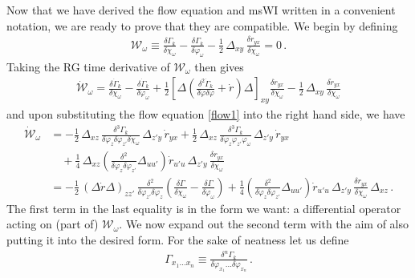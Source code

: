 \documentclass[11pt,draft]{book} %
\begin{document}
Now that we have derived the flow equation and msWI written in a convenient notation,
we are ready to prove that they are compatible. We begin by defining
\begin{align}
	\mathcal{W}_\omega\equiv\frac{\delta \Gamma_k}{\delta\chi_\omega}-\frac{\delta \Gamma_k}{\delta\varphi_\omega}
	- \frac{1}{2} \, \Delta_{xy} \, \frac{\delta r_{yx}}{\delta\chi_\omega} =0 \,.
\label{cal-W}
\end{align}
Taking the RG time derivative of $\mathcal{W_\omega}$ then gives
\begin{align}
	\mathcal{\dot W}_\omega= \frac{\delta \dot\Gamma_k}{\delta\chi_\omega}
	-\frac{\delta \dot\Gamma_k}{\delta\varphi_\omega}+
	\frac{1}{2}\left[\Delta\left(\frac{\delta^{2}\dot{\Gamma}_k}{\delta\varphi \delta\varphi}
	+\dot r\right)\Delta\right]_{\!xy}\frac{\delta r_{yx}}{\delta\chi_\omega}
	-\frac{1}{2} \, \Delta_{xy} \, \frac{\delta \dot r_{yx}}{\delta\chi_\omega}
	\label{WIdot}
\end{align}
and upon substituting the flow equation \eqref{flow1} into the right hand side, we have
\begin{align}
  \label{WIdot-2}
	\mathcal{\dot W}_{\omega} &= -\frac{1}{2} \, \Delta_{xz} \,
	\frac{\delta^{3}\Gamma_k}{\delta\varphi_{z}\delta\varphi_{z'}\delta\chi_{\omega}}
  \, \Delta_{z'y} \, \dot r_{yx}
	 + \frac{1}{2} \, \Delta_{xz} \, \frac{\delta^{3}\Gamma_k}{\delta\varphi_{z} \varphi_{z'}\varphi_\omega} \,
   \Delta_{z'y} \, \dot{r}_{yx}
	 \nonumber\\ &\quad
	 + \frac{1}{4} \, \Delta_{xz}
   \left(
     \frac{\delta^{2}}{\delta\varphi_{z}\delta\varphi_{z'}}\Delta_{uu'}
   \right)
	 \dot r_{u'u} \, \Delta_{z'y} \, \frac{\delta r_{yx}}{\delta\chi_{\omega}} \nonumber \\
	&= -\frac{1}{2} \, (\Delta \dot{r} \Delta)_{zz'} \, \frac{\delta^{2}}{\delta\varphi_{z'}\delta\varphi_{z}}
	 \left(\frac{\delta\Gamma}{\delta\chi_\omega}-\frac{\delta\Gamma}{\delta\varphi_\omega}\right)
	  +\frac{1}{4}\left(\frac{\delta^{2}}{\delta\varphi_{z}\delta\varphi_{z'}}\Delta_{uu'}\right)
	 \dot r_{u'u} \, \Delta_{z'y} \, \frac{\delta r_{yx}}{\delta\chi_{\omega}} \, \Delta_{xz} \,.
\end{align}
The first term in the last equality is in the form we want: a differential operator acting on (part of)
$\mathcal{W_\omega}$. We now expand out the second term with the aim of also putting it into the desired form.
For the sake of neatness let us define
\begin{align}
		\Gamma_{x_1...x_n}\equiv \frac{\delta^n\Gamma_k}{\delta\varphi_{x_1}...\delta\varphi_{x_n}} \,.
\end{align}
\end{document}
